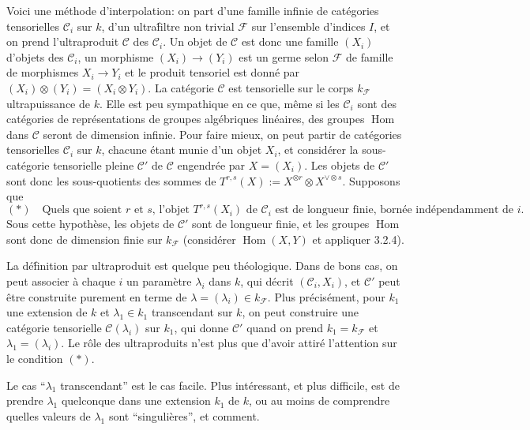 \documentclass[11pt,a4paper]{article}
\theoremstyle{plain}
\theoremstyle{definition}
\DeclareMathOperator{\Hom}{Hom}
\begin{document}
Voici une m\'ethode d'interpolation: on part d'une famille infinie de cat\'egories tensorielles $\mathcal{C}_i$ sur $k$, d'un ultra\'filtre non trivial $\mathcal{F}$ sur l'ensemble d'indices $I$, et on prend l'ultraproduit $\mathcal{C}$ des $\mathcal{C}_i$. Un objet de $\mathcal{C}$ est donc une famille $(X_i)$ d'objets des $\mathcal{C}_i$, un morphisme $(X_i) \to (Y_i)$ est un germe selon $\mathcal{F}$ de famille de morphismes $X_i \to Y_i$ et le produit tensoriel est donn\'e par $(X_i) \otimes (Y_i) = (X_i \otimes Y_i)$. La cat\'egorie $\mathcal{C}$ est tensorielle sur le corps $k_{\mathcal{F}}$ ultrapuissance de $k$. Elle est peu sympathique en ce que, m\^eme si les $\mathcal{C}_i$ sont des cat\'egories de repr\'esentations de groupes alg\'ebriques lin\'eaires, des groupes $\Hom$ dans $\mathcal{C}$ seront de dimension infinie. Pour faire mieux, on peut partir de cat\'egories tensorielles $\mathcal{C}_i$ sur $k$, chacune \'etant munie d'un objet $X_i$, et consid\'erer la sous-cat\'egorie tensorielle pleine $\mathcal{C}'$ de $\mathcal{C}$ engendr\'ee par $X = (X_i)$. Les objets de $\mathcal{C}'$ sont donc les sous-quotients des sommes de $T^{r,s}(X) := X^{\otimes r} \otimes X^{\vee \otimes s}$. Supposons que
\begin{equation*}
(\ast) \quad \text{Quels que soient $r$ et $s$, l'objet $T^{r,s}(X_i)$ de $\mathcal{C}_i$ est de longueur finie, born\'ee ind\'ependamment de $i$.}
\end{equation*}
Sous cette hypoth\`ese, les objets de $\mathcal{C}'$ sont de longueur finie, et les groupes $\Hom$ sont donc de dimension finie sur $k_{\mathcal{F}}$ (consid\'erer $\Hom(X,Y)$ et appliquer 3.2.4).

La d\'e\'finition par ultraproduit est quelque peu th\'eologique. Dans de bons cas, on peut associer \`a chaque $i$ un param\`etre $\lambda_i$ dans $k$, qui d\'ecrit $(\mathcal{C}_i, X_i)$, et $\mathcal{C}'$ peut \^etre construite purement en terme de $\lambda = (\lambda_i) \in k_{\mathcal{F}}$. Plus pr\'ecis\'ement, pour $k_1$ une extension de $k$ et $\lambda_1 \in k_1$ transcendant sur $k$, on peut construire une cat\'egorie tensorielle $\mathcal{C}(\lambda_i)$ sur $k_1$, qui donne $\mathcal{C}'$ quand on prend $k_1 = k_{\mathcal{F}}$ et $\lambda_1 = (\lambda_i)$. Le r\^ole des ultraproduits n'est plus que d'avoir attir\'e l'attention sur le condition $(\ast)$.

Le cas ``$\lambda_1$ transcendant'' est le cas facile. Plus int\'eressant, et plus difficile, est de prendre $\lambda_1$ quelconque dans une extension $k_1$ de $k$, ou au moins de comprendre quelles valeurs de $\lambda_1$ sont ``singuli\`eres'', et comment.
\end{document}
